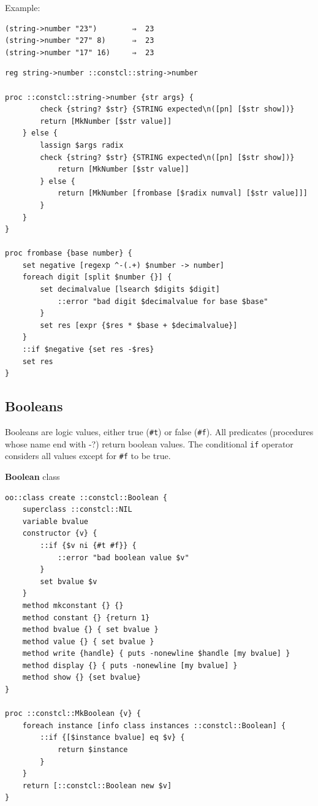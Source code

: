 \documentclass[twoside,9pt]{report}
\begin{document}
Example:

\noindent\makebox[\linewidth]{\rule{\linewidth}{0.4pt}}
\begin{lstlisting}
(string->number "23")        ⇒  23
(string->number "27" 8)      ⇒  23
(string->number "17" 16)     ⇒  23
\end{lstlisting}
\noindent\makebox[\linewidth]{\rule{\linewidth}{0.4pt}}
\noindent\makebox[\linewidth]{\rule{\linewidth}{0.4pt}}
\begin{lstlisting}
reg string->number ::constcl::string->number
 
proc ::constcl::string->number {str args} {
        check {string? $str} {STRING expected\n([pn] [$str show])}
        return [MkNumber [$str value]]
    } else {
        lassign $args radix
        check {string? $str} {STRING expected\n([pn] [$str show])}
            return [MkNumber [$str value]]
        } else {
            return [MkNumber [frombase [$radix numval] [$str value]]]
        }
    }
}
 
proc frombase {base number} {
    set negative [regexp ^-(.+) $number -> number]
    foreach digit [split $number {}] {
        set decimalvalue [lsearch $digits $digit]
            ::error "bad digit $decimalvalue for base $base"
        }
        set res [expr {$res * $base + $decimalvalue}]
    }
    ::if $negative {set res -$res}
    set res
}
\end{lstlisting}
\noindent\makebox[\linewidth]{\rule{\linewidth}{0.4pt}}
\subsection{Booleans}
\label{booleans}

Booleans are logic values, either true (\texttt{\#t}) or false (\texttt{\#f}). All predicates (procedures whose name end with -?) return boolean values. The conditional \texttt{if} operator considers all values except for \texttt{\#f} to be true.


\textbf{Boolean} class

\noindent\makebox[\linewidth]{\rule{\linewidth}{0.4pt}}
\begin{lstlisting}
oo::class create ::constcl::Boolean {
    superclass ::constcl::NIL
    variable bvalue
    constructor {v} {
        ::if {$v ni {#t #f}} {
            ::error "bad boolean value $v"
        }
        set bvalue $v
    }
    method mkconstant {} {}
    method constant {} {return 1}
    method bvalue {} { set bvalue }
    method value {} { set bvalue }
    method write {handle} { puts -nonewline $handle [my bvalue] }
    method display {} { puts -nonewline [my bvalue] }
    method show {} {set bvalue}
}
 
proc ::constcl::MkBoolean {v} {
    foreach instance [info class instances ::constcl::Boolean] {
        ::if {[$instance bvalue] eq $v} {
            return $instance
        }
    }
    return [::constcl::Boolean new $v]
}
\end{lstlisting}
\noindent\makebox[\linewidth]{\rule{\linewidth}{0.4pt}}
\end{document}
